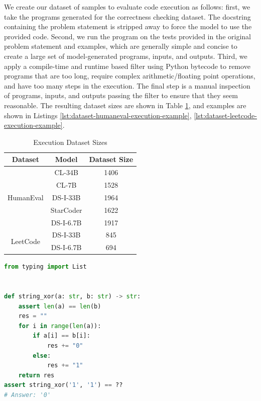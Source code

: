 We create our dataset of samples to evaluate code execution as follows: first, we take the programs generated for the correctness checking dataset. The docstring containing the problem statement is stripped away to force the model to use the provided code. Second, we run the program on the tests provided in the original problem statement and examples, which are generally simple and concise to create a large set of model-generated programs, inputs, and outputs. Third, we apply a compile-time and runtime based filter using Python bytecode to remove programs that are too long, require complex arithmetic/floating point operations, and have too many steps in the execution. The final step is a manual inspection of programs, inputs, and outputs passing the filter to ensure that they seem reasonable. The resulting dataset sizes are shown in Table \ref{tab:dataset-sizes-execution}, and examples are shown in Listings \ref{lst:dataset-humaneval-execution-example}, \ref{lst:dataset-leetcode-execution-example}.

\begin{table}[H]
    \centering
    \caption{Execution Dataset Sizes}
    \begin{tabular}{ccc}
        \toprule
        \textbf{Dataset} & \textbf{Model} & \textbf{Dataset Size} \\
	\midrule
	\multirow{5}{*}{HumanEval}
	& CL-34B & 1406 \\
	& CL-7B & 1528 \\
	& DS-I-33B & 1964 \\
	& StarCoder & 1622 \\
	& DS-I-6.7B & 1917 \\
        \midrule
	\multirow{2}{*}{LeetCode}
	& DS-I-33B & 845 \\
	& DS-I-6.7B & 694 \\
    \bottomrule
    \end{tabular}
    \label{tab:dataset-sizes-execution}
\end{table}

\begin{lstlisting}[language=python,caption={Example of HumanEval execution prediction example, generated by StarCoder},style=boxed,label={lst:dataset-humaneval-execution-example}]
from typing import List


def string_xor(a: str, b: str) -> str:
    assert len(a) == len(b)
    res = ""
    for i in range(len(a)):
        if a[i] == b[i]:
            res += "0"
        else:
            res += "1"
    return res
assert string_xor('1', '1') == ??
# Answer: '0'
\end{lstlisting}

